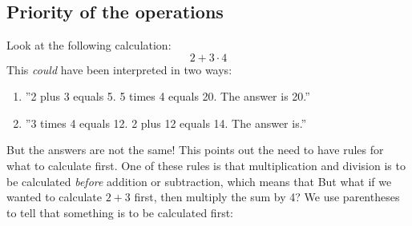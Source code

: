 



\section{\rrek}
\subsection*{Priority of the operations}
Look at the following calculation:
\[ 2+3\cdot4 \]
This \textsl{could} have been interpreted in two ways:
\begin{enumerate}
	\item ''2 plus 3 equals 5. 5 times 4 equals 20. The answer is 20.''
	\item ''3 times 4 equals 12. 2 plus 12 equals 14. The answer is.''
\end{enumerate}
But the answers are not the same! This points out the need to have rules for what to calculate first. One of these rules is that multiplication and division is to be calculated \textsl{before} addition or subtraction, which means that \regv
\st{ \vs
{}
}
But what if we wanted to calculate $ 2+3 $ first, then multiply the sum by 4? We use parentheses to tell that something is to be calculated first: \regv
\st{\vs
{}
}\regv

\newpage
{}
